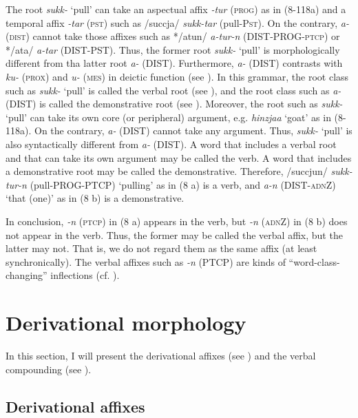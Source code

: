 The root \textit{sukk-} ‘pull’ can take an aspectual affix \textit{{}-tur} (\textsc{prog}) as in (8\nobreakdash-118a) and a temporal affix \textit{{}-tar} (\textsc{pst}) such as /succja/ \textit{sukk-tar} (pull-P\textsc{st}). On the contrary, \textit{a-} (\textsc{dist}) cannot take those affixes such as */atun/ \textit{a-tur-n} (DIST-PROG-\textsc{ptcp}) or */ata/ \textit{a-tar} (DIST-PST). Thus, the former root \textit{sukk-} ‘pull’ is morphologically different from tha latter root \textit{a-} (DIST). Furthermore, \textit{a-} (DIST) contrasts with \textit{ku-} (\textsc{prox}) and \textit{u-} (\textsc{mes}) in deictic function (see ). In this grammar, the root class such as \textit{sukk-} ‘pull’ is called the verbal root (see ), and the root class such as \textit{a-} (DIST) is called the demonstrative root (see ). Moreover, the root such as \textit{sukk-} ‘pull’ can take its own core (or peripheral) argument, e.g. \textit{hinzjaa} ‘goat’ as in (8\nobreakdash-118a). On the contrary, \textit{a-} (DIST) cannot take any argument. Thus, \textit{sukk-} ‘pull’ is also syntactically different from \textit{a-} (DIST). A word that includes a verbal root and that can take its own argument may be called the verb. A word that includes a demonstrative root may be called the demonstrative. Therefore, /succjun/ \textit{sukk-tur-n} (pull-PROG-PTCP) ‘pulling’ as in (8 a) is a verb, and \textit{a-n} (DIST-\textsc{adn}Z) ‘that (one)’ as in (8 b) is a demonstrative.

  In conclusion, \textit{{}-n} (\textsc{ptcp}) in (8 a) appears in the verb, but \textit{-n} (\textsc{adn}Z) in (8 b) does not appear in the verb. Thus, the former may be called the verbal affix, but the latter may not. That is, we do not regard them as the same affix (at least synchronically). The verbal affixes such as \textit{{}-n} (PTCP) are kinds of “word-class-changing” inflections (cf. \citealt{Haspelmath1996}).

\section{Derivational morphology}

In this section, I will present the derivational affixes (see ) and the verbal compounding (see ).

\subsection{Derivational affixes}

